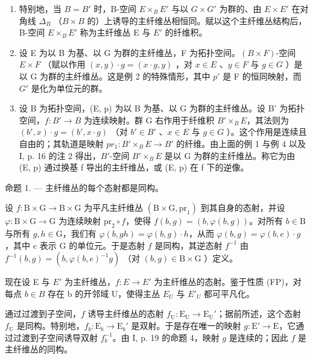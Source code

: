 \begin{enumerate}
\def\labelenumi{\arabic{enumi})}
\setcounter{enumi}{2}
\item
  特别地，当 \(B = B'\) 时，B-空间 \(E \times_{B} E'\) 与以 \(G \times G'\) 为群的、由 \(E \times E'\) 在对角线 \(\Delta_{B}\) （\(B \times B\) 的）上诱导的主纤维丛相恒同。赋以这个主纤维丛结构后，B-空间 \(E \times_{B} E'\) 称为主纤维丛 E 与 \(E'\) 的纤维积。
\item
  设 E 为以 B 为基、以 G 为群的主纤维丛，F 为拓扑空间。\((B \times F)\)-空间 \(E \times F\) （赋以作用 \((x, y) \cdot g = (x \cdot g, y)\) ，对 \(x \in E\) 、\(y \in F\) 与 \(g \in G\) ）是以 G 为群的主纤维丛。这是例 2 的特殊情形，其中 \(p'\) 是 F 的恒同映射，而 \(G'\) 是化为单位元的群。
\item
  设 B 为拓扑空间，(E, p) 为以 B 为基、以 G 为群的主纤维丛。设 B' 为拓扑空间，\(f: B' \to B\) 为连续映射。群 G 右作用于纤维积 \(B' \times_{B} E\)，其法则为 \((b', x) \cdot g = (b', x \cdot g)\) （对 \(b' \in B'\) 、\(x \in E\) 与 \(g \in G\) ）。这个作用是连续且自由的；其轨道是映射 \(pr_{1}: B' \times_{B} E \to B'\) 的纤维。由上面的例 1 与例 4 以及 I, p. 16 的注 2 得出，\(B'\)-空间 \(B' \times_{B} E\) 是以 G 为群的主纤维丛。称它为由 (E, p) 通过换基 f 导出的主纤维丛，或 (E, p) 在 f 下的逆像。
\end{enumerate}

命题 1. --- 主纤维丛的每个态射都是同构。

设 \(f \colon \mathrm{B} \times \mathrm{G} \to \mathrm{B} \times \mathrm{G}\) 为平凡主纤维丛 \((\mathrm{B} \times \mathrm{G},\mathrm{pr}_1)\) 到其自身的态射，并设 \(\varphi \colon \mathrm{B} \times \mathrm{G} \to \mathrm{G}\) 为连续映射 \(\mathrm{pr}_2 \circ f\)，使得 \(f(b, g) = (b, \varphi(b, g))\)。对所有 \(b \in \mathrm{B}\) 与所有 \(g, h \in \mathrm{G}\)，我们有 \(\varphi(b, gh) = \varphi(b, g) \cdot h\)，从而 \(\varphi(b, g) = \varphi(b, e) \cdot g\)，其中 \(e\) 表示 \(\mathrm{G}\) 的单位元。于是态射 \(f\) 是同构，其逆态射 \(f^{-1}\) 由 \(f^{-1}(b, g) = (b, \varphi(b, e)^{-1}g)\) （对 \((b, g) \in \mathrm{B} \times \mathrm{G}\) ）定义。

现在设 E 与 \(E'\) 为主纤维丛，\(f: E \to E'\) 为主纤维丛的态射。鉴于性质 (FP)，对每点 \(b \in B\) 存在 b 的开邻域 U，使得主丛 \(E_{U}\) 与 \(E'_{U}\) 都可平凡化。

通过过渡到子空间，\(f\) 诱导主纤维丛的态射 \(f_{\mathrm{U}}: \mathrm{E}_{\mathrm{U}} \to \mathrm{E}_{\mathrm{U}}'\)；据前所述，这个态射 \(f_{\mathrm{U}}\) 是同构。特别地，\(f_{b}: \mathrm{E}_{b} \to \mathrm{E}_{b}'\) 是双射。于是存在唯一的映射 \(g: \mathrm{E}' \to \mathrm{E}\)，它通过过渡到子空间诱导双射 \(f_{b}^{-1}\)。由 I, p. 19 的命题 4，映射 \(g\) 是连续的；因此 \(f\) 是主纤维丛的同构。

